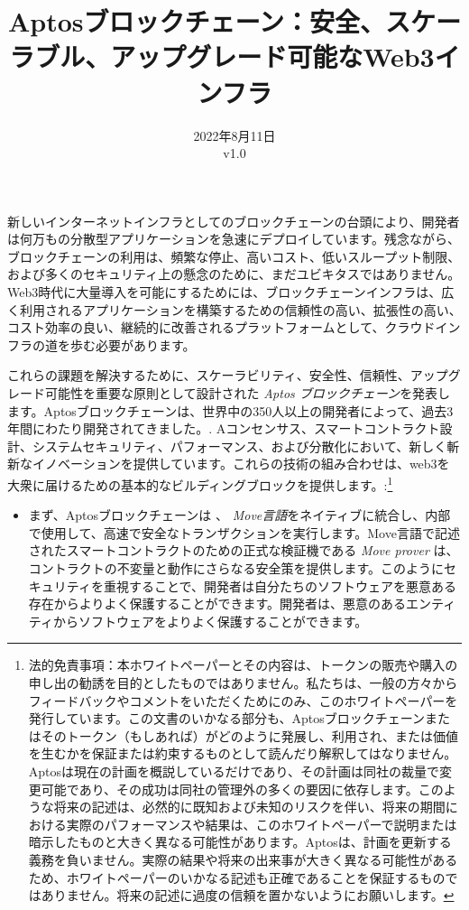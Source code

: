 \documentclass{article}
\title{Aptosブロックチェーン：安全、スケーラブル、アップグレード可能なWeb3インフラ}
\author{}
\date{2022年8月11日\\v1.0}
\begin{document}
\maketitle

\renewcommand{\abstractname}{要約}
\renewcommand{\figurename}{絵}

\begin{CJK}{UTF8}{min}
新しいインターネットインフラとしてのブロックチェーンの台頭により、開発者は何万もの分散型アプリケーションを急速にデプロイしています。残念ながら、ブロックチェーンの利用は、頻繁な停止、高いコスト、低いスループット制限、および多くのセキュリティ上の懸念のために、まだユビキタスではありません。Web3時代に大量導入を可能にするためには、ブロックチェーンインフラは、広く利用されるアプリケーションを構築するための信頼性の高い、拡張性の高い、コスト効率の良い、継続的に改善されるプラットフォームとして、クラウドインフラの道を歩む必要があります。

これらの課題を解決するために、スケーラビリティ、安全性、信頼性、アップグレード可能性を重要な原則として設計された \emph{Aptos ブロックチェーン}を発表します。Aptosブロックチェーンは、世界中の350人以上の開発者によって、過去3年間にわたり開発されてきました。\cite{aptos_core_github}. Aコンセンサス、スマートコントラクト設計、システムセキュリティ、パフォーマンス、および分散化において、新しく斬新なイノベーションを提供しています。これらの技術の組み合わせは、web3を大衆に届けるための基本的なビルディングブロックを提供します。:\footnote{法的免責事項：本ホワイトペーパーとその内容は、トークンの販売や購入の申し出の勧誘を目的としたものではありません。私たちは、一般の方々からフィードバックやコメントをいただくためにのみ、このホワイトペーパーを発行しています。この文書のいかなる部分も、Aptosブロックチェーンまたはそのトークン（もしあれば）がどのように発展し、利用され、または価値を生むかを保証または約束するものとして読んだり解釈してはなりません。Aptosは現在の計画を概説しているだけであり、その計画は同社の裁量で変更可能であり、その成功は同社の管理外の多くの要因に依存します。このような将来の記述は、必然的に既知および未知のリスクを伴い、将来の期間における実際のパフォーマンスや結果は、このホワイトペーパーで説明または暗示したものと大きく異なる可能性があります。Aptosは、計画を更新する義務を負いません。実際の結果や将来の出来事が大きく異なる可能性があるため、ホワイトペーパーのいかなる記述も正確であることを保証するものではありません。将来の記述に過度の信頼を置かないようにお願いします。}
 
 \begin{itemize}
  \item まず、Aptosブロックチェーンは 、 \emph{Move言語}をネイティブに統合し、内部で使用して、高速で安全なトランザクションを実行します\cite{move_github}。Move言語で記述されたスマートコントラクトのための正式な検証機である \emph{Move prover} は、コントラクトの不変量と動作にさらなる安全策を提供します。このようにセキュリティを重視することで、開発者は自分たちのソフトウェアを悪意ある存在からよりよく保護することができます。開発者は、悪意のあるエンティティからソフトウェアをよりよく保護することができます。
  

\end{itemize}
\end{CJK}
\end{document}
